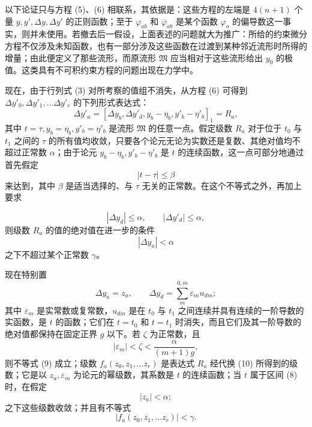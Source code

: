 \documentclass[11pt,a4paper,leqno]{article}
\begin{document}
以下论证只与方程 (5)、(6) 相联系，其依据是：这些方程的左端是 $4(n+1)$ 个量 $y,y',\Delta y,\Delta y'$ 的正则函数；至于 $\varphi_{ab}$ 和 $\overline{\varphi}_{ab}$ 是某个函数 $\varphi_a$ 的偏导数这一事实，则并未使用。若撤去后一假设，上面表述的问题就大为推广：所给的约束微分方程不仅涉及未知函数，也有一部分涉及这些函数在过渡到某种邻近流形时所得的增量；由此便定义了那些流形，而原流形 $\mathfrak M$ 应当相对于这些流形给出 $y_0$ 的极值。这类具有不可积约束方程的问题出现在力学中。

现在，由于行列式 (3) 对所考察的值组不消失，从方程 (6) 可得到 $\Delta y'_0,\Delta y'_1,\ldots\Delta y'_r$ 的下列形式表达式：
\begin{equation}\tag{7}
\Delta y'_a=[\Delta y_b,\Delta y'_d,y_b-\eta_b,y'_b-\eta'_b]_1=R_a,
\end{equation}
其中 $t=\tau,y_b=\eta_b,y'_b=\eta'_b$ 是流形 $\mathfrak M$ 的任意一点。假定级数 $R_a$ 对于位于 $t_0$ 与 $t_1$ 之间的 $\tau$ 的所有值均收敛，只要各个论元无论为实数还是复数、其绝对值均不超过正常数 $\alpha$；由于论元 $y_b-\eta_b,y'_b-\eta'_b$ 是 $t$ 的连续函数，这一点可部分地通过首先假定
\begin{equation}\tag{8}
|t-\tau|\leq\beta
\end{equation}
来达到，其中 $\beta$ 是适当选择的、与 $\tau$ 无关的正常数。在这个不等式之外，再加上要求

\begin{equation}\tag{9}
|\Delta y_d|\leq\alpha,\qquad |\Delta y'_d|\leq\alpha,
\end{equation}
则级数 $R_a$ 的值的绝对值在进一步的条件
\[
|\Delta y_a|<\alpha
\]
之下不超过某个正常数 $\gamma$。

现在特别置
\begin{equation}\tag{10}
\Delta y_a=z_a,\qquad
\Delta y_d=\sum_m^{0,m}\varepsilon_m u_{dm};
\end{equation}
其中 $\varepsilon_m$ 是实常数或复常数，$u_{dm}$ 是在 $t_0$ 与 $t_1$ 之间连续并具有连续的一阶导数的实函数，是 $t$ 的函数；它们在 $t=t_0$ 和 $t=t_1$ 时消失，而且它们及其一阶导数的绝对值都保持在固定正界 $g$ 以下。若 $\zeta$ 为正常数，且
\[
|\varepsilon_m|<\zeta<\frac{\alpha}{(m+1)g},
\]
则不等式 (9) 成立；级数 $f_a(z_0,z_1,\ldots z_r)$ 是表达式 $R_a$ 经代换 (10) 所得到的级数；它是以 $z_a,\varepsilon_m$ 为论元的幂级数，其系数是 $t$ 的连续函数；当 $t$ 属于区间 (8) 时，在假定
\[
|z_a|<\alpha;
\]
之下这些级数收敛；并且有不等式
\begin{equation}\tag{11}
|f_a(z_0,z_1,\ldots z_r)|<\gamma.
\end{equation}
\end{document}
